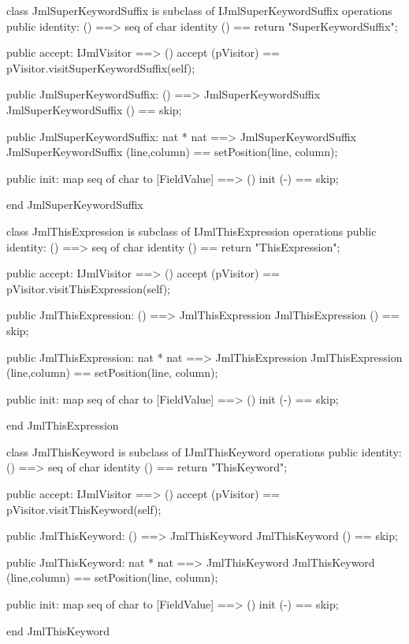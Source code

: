 \begin{vdm_al}
class JmlSuperKeywordSuffix is subclass of IJmlSuperKeywordSuffix
operations
  public identity: () ==> seq of char
  identity () == return "SuperKeywordSuffix";

  public accept: IJmlVisitor ==> ()
  accept (pVisitor) == pVisitor.visitSuperKeywordSuffix(self);

  public JmlSuperKeywordSuffix:
    () ==> JmlSuperKeywordSuffix
  JmlSuperKeywordSuffix () == 
    skip;

  public JmlSuperKeywordSuffix:
    nat *
    nat ==> JmlSuperKeywordSuffix
  JmlSuperKeywordSuffix (line,column) == 
    setPosition(line, column);

  public init: map seq of char to [FieldValue] ==> ()
  init (-) == skip;

end JmlSuperKeywordSuffix
\end{vdm_al}

\begin{vdm_al}
class JmlThisExpression is subclass of IJmlThisExpression
operations
  public identity: () ==> seq of char
  identity () == return "ThisExpression";

  public accept: IJmlVisitor ==> ()
  accept (pVisitor) == pVisitor.visitThisExpression(self);

  public JmlThisExpression:
    () ==> JmlThisExpression
  JmlThisExpression () == 
    skip;

  public JmlThisExpression:
    nat *
    nat ==> JmlThisExpression
  JmlThisExpression (line,column) == 
    setPosition(line, column);

  public init: map seq of char to [FieldValue] ==> ()
  init (-) == skip;

end JmlThisExpression
\end{vdm_al}

\begin{vdm_al}
class JmlThisKeyword is subclass of IJmlThisKeyword
operations
  public identity: () ==> seq of char
  identity () == return "ThisKeyword";

  public accept: IJmlVisitor ==> ()
  accept (pVisitor) == pVisitor.visitThisKeyword(self);

  public JmlThisKeyword:
    () ==> JmlThisKeyword
  JmlThisKeyword () == 
    skip;

  public JmlThisKeyword:
    nat *
    nat ==> JmlThisKeyword
  JmlThisKeyword (line,column) == 
    setPosition(line, column);

  public init: map seq of char to [FieldValue] ==> ()
  init (-) == skip;

end JmlThisKeyword
\end{vdm_al}


